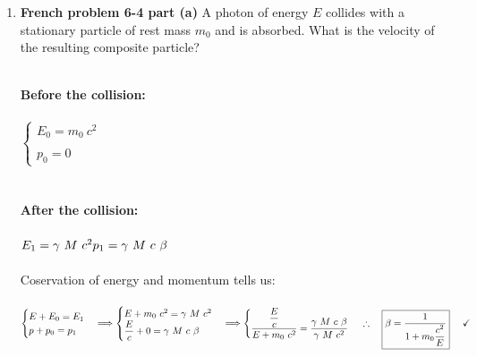 \documentclass[fleqn]{article}
\begin{document}
\begin{enumerate}
    \item \textbf{French problem 6-4 part (a)} A photon of energy $E$ collides with a stationary particle of rest mass $m_0$ and 
    is absorbed. What is the velocity of the resulting composite particle?

      \textcolor{hwColor}{
        \\
        \textbf{Before the collision:}
        \\
        \\
        $
          \begin{cases}
            E_0=m_0 ~ c^2
            \\
            \\
            p_0=0
          \end{cases}
        $
        \\
        \\
        \\
        \textbf{After the collision:}
        \\
        \\
        $
          E_1=\gamma ~ M ~ c^2
          \\
          \\
          p_1=\gamma ~ M ~ c ~ \beta
        $
        \\
        \\
        Coservation of energy and momentum tells us:
        \\
        \\
        $
          \begin{cases}
            E+E_0=E_1
            \\
            p+p_0=p_1
          \end{cases} \Longrightarrow \begin{cases}
            E+m_0 ~ c^2=\gamma ~ M ~ c^2
            \\
            \dfrac{E}{c}+0=\gamma ~ M ~ c ~ \beta
          \end{cases}
           \Longrightarrow \begin{cases}
             \dfrac{\dfrac{E}{c}}{E+m_0 ~ c^2}=\dfrac{\gamma ~ M ~ c ~ \beta}{\gamma ~ M ~ c^2}
           \end{cases}
           \\
           \\
           \\
           \therefore ~~~ \boxed{\beta=\dfrac{1}{1+m_0 \dfrac{c^2}{E}}} ~~~~ \checkmark
        $
      }
    

  \end{enumerate}
\end{document}
